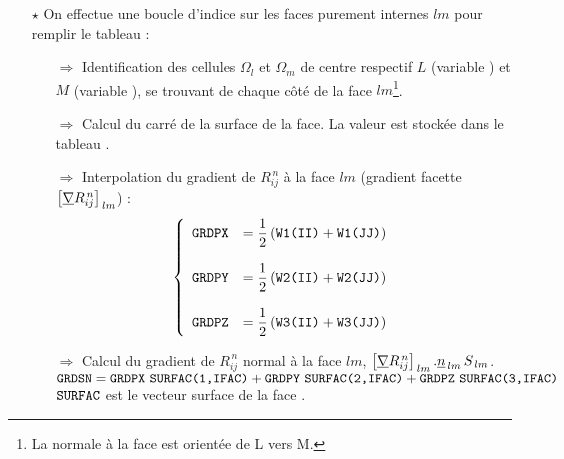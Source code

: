 \begin{itemize}
\begin{itemize}
\item [$\star$] On effectue une boucle d'indice  sur les faces
purement internes $lm$ pour remplir le tableau  :
\begin{itemize}
\item [$\Rightarrow$] Identification des cellules $\Omega_l$ et $\Omega_m$ de
centre respectif $L$ (variable ) et $M$ (variable ), se trouvant de chaque c\^ot\'e de la face
$lm$\footnote{La normale \`a la face est orient\'ee de L vers M.}.
\item [$\Rightarrow$] Calcul du carr\'e de la surface de la face. La valeur est
stock\'ee dans le tableau .
\item [$\Rightarrow$] Interpolation du gradient de $R^{\,n}_{ij}$ \`a la face
$lm$ (gradient facette $\left[\underline{\nabla}{R}^{\,n}_{ij}\right]_{\,lm}$) :
\begin{equation}\notag
\left\{\begin{array}{ll}
\text{\texttt{GRDPX}} &= \displaystyle \frac{1}{2} \left(\text{\texttt{W1(II)}} + \text{\texttt{W1(JJ)}}
\right) \\
&\\
\text{\texttt{GRDPY}} &= \displaystyle \frac{1}{2} \left(\text{\texttt{W2(II)}} + \text{\texttt{W2(JJ)}} \right) \\
&\\
\text{\texttt{GRDPZ}} &= \displaystyle \frac{1}{2} \left(\text{\texttt{W3(II)}} + \text{\texttt{W3(JJ)}} \right)
\end{array}\right.
\end{equation}
\item [$\Rightarrow$] Calcul du gradient de $R^{\,n}_{ij}$ normal \`a la face
$lm$, $\left[\underline{\nabla}{R}^{\,n}_{ij}\right]_{\,lm}.\underline{n}_{\,lm}\,S_{\,lm}$.\\

$\displaystyle \var{GRDSN} =  \var{GRDPX} \ \var{SURFAC(1,IFAC)} + \var{GRDPY} \ \var{SURFAC(2,IFAC)} +  \var{GRDPZ} \ \var{SURFAC(3,IFAC)}$
$\text{\texttt{SURFAC}}$ est le vecteur surface de la face .



\end{itemize}
\end{itemize}
\end{itemize}
